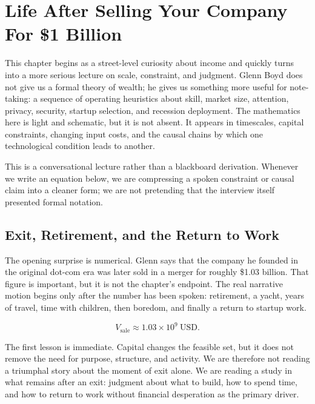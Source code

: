 \chapter{Life After Selling Your Company For \$1 Billion}

This chapter begins as a street-level curiosity about income and quickly turns into a more serious lecture on scale, constraint, and judgment. Glenn Boyd does not give us a formal theory of wealth; he gives us something more useful for note-taking: a sequence of operating heuristics about skill, market size, attention, privacy, security, startup selection, and recession deployment. The mathematics here is light and schematic, but it is not absent. It appears in timescales, capital constraints, changing input costs, and the causal chains by which one technological condition leads to another.

\begin{remark}
This is a conversational lecture rather than a blackboard derivation. Whenever we write an equation below, we are compressing a spoken constraint or causal claim into a cleaner form; we are not pretending that the interview itself presented formal notation.
\end{remark}

\section{Exit, Retirement, and the Return to Work}

The opening surprise is numerical. Glenn says that the company he founded in the original dot-com era was later sold in a merger for roughly \$1.03 billion. That figure is important, but it is not the chapter's endpoint. The real narrative motion begins only after the number has been spoken: retirement, a yacht, years of travel, time with children, then boredom, and finally a return to startup work.

\begin{equation}
V_{\mathrm{sale}} \approx 1.03\times 10^{9}\ \mathrm{USD}.
\end{equation}

The first lesson is immediate. Capital changes the feasible set, but it does not remove the need for purpose, structure, and activity. We are therefore not reading a triumphal story about the moment of exit alone. We are reading a study in what remains after an exit: judgment about what to build, how to spend time, and how to return to work without financial desperation as the primary driver.

